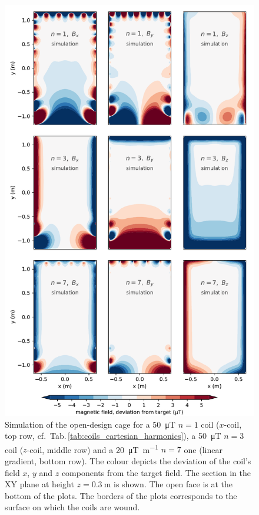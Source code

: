 \begin{figure}
  \centering
  \includegraphics[width=0.95\linewidth]{gfx/prototype/open_design_simulation.pdf}
  \caption{Simulation of the open-design cage for a \SI{50}{\micro\tesla} $n = 1$ coil ($x$-coil, top row, cf.\ Tab.\,\ref{tab:coils_cartesian_harmonics}), a \SI{50}{\micro\tesla} $n = 3$ coil ($z$-coil, middle row) and a \SI[per-mode=symbol]{20}{\micro\tesla\per\metre} $n = 7$ one (linear gradient, bottom row).
  The colour depicts the deviation of the coil's field $x$, $y$ and $z$ components from the target field.
  The section in the XY plane at height $z=\SI{0.3}{\meter}$ is shown.
  The open face is at the bottom of the plots.
  The borders of the plots corresponds to the surface on which the coils are wound.
  }\label{fig:prototype_open_design_simulation}
\end{figure}

